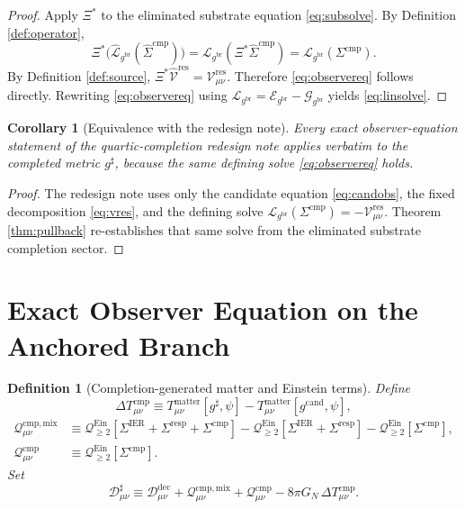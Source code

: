 \documentclass[11pt]{article}
\newcommand{\ObserverMap}{\Xi}
\newcommand{\ObserverMetric}{g^{\mathrm{br}}}
\newcommand{\CandidateMetric}{g^{\mathrm{cand}}}
\newcommand{\CompletedMetric}{g^{\sharp}}
\newcommand{\BaseShift}{\Sigma^{\mathrm{IER}}}
\newcommand{\ResponseShift}{\Sigma^{\mathrm{resp}}}
\newcommand{\CompShift}{\Sigma^{\mathrm{cmp}}}
\newcommand{\CompLift}{\widehat\Sigma^{\mathrm{cmp}}}
\newcommand{\ResidualCore}{\mathcal V_{\mu\nu}^{\mathrm{res}}}
\newcommand{\ResidualDec}{\mathcal D_{\mu\nu}^{\mathrm{dec}}}
\newcommand{\ResidualLift}{\widehat{\mathcal V}^{\mathrm{res}}}
\newcommand{\SubReducedEin}{\widehat{\mathcal L}_{\ObserverMetric}}
\newcommand{\ReducedEin}{\mathcal L_{\ObserverMetric}}
\newcommand{\GaugeBook}{\mathcal G_{\ObserverMetric}}
\newcommand{\EinLin}{\mathcal E_{\ObserverMetric}}
\newcommand{\EinQuad}{\mathcal Q_{\ge 2}^{\mathrm{Ein}}}
\newcommand{\CompMix}{\mathcal Q_{\mu\nu}^{\mathrm{cmp,mix}}}
\newcommand{\CompQuad}{\mathcal Q_{\mu\nu}^{\mathrm{cmp}}}
\newcommand{\CompDec}{\mathcal D_{\mu\nu}^{\sharp}}
\newcommand{\DeltaTComp}{\Delta T_{\mu\nu}^{\mathrm{cmp}}}
\newtheorem{definition}{Definition}
\newtheorem{corollary}{Corollary}
\begin{document}
\begin{proof}
Apply \(\ObserverMap^*\) to the eliminated substrate equation \eqref{eq:subsolve}. By Definition \ref{def:operator},
\[
\ObserverMap^*\bigl(\SubReducedEin(\CompLift)\bigr)
=
\ReducedEin(\ObserverMap^*\CompLift)
=
\ReducedEin(\CompShift).
\]
By Definition \ref{def:source}, \(\ObserverMap^*\ResidualLift=\ResidualCore\). Therefore \eqref{eq:observereq} follows directly. Rewriting \eqref{eq:observereq} using \(\ReducedEin=\EinLin-\GaugeBook\) yields \eqref{eq:linsolve}.
\end{proof}

\begin{corollary}[Equivalence with the redesign note]
\label{cor:equiv}
Every exact observer-equation statement of the quartic-completion redesign note applies verbatim to the completed metric \(\CompletedMetric\), because the same defining solve \eqref{eq:observereq} holds.
\end{corollary}

\begin{proof}
The redesign note uses only the candidate equation \eqref{eq:candobs}, the fixed decomposition \eqref{eq:vres}, and the defining solve \(\ReducedEin(\CompShift)=-\ResidualCore\). Theorem \ref{thm:pullback} re-establishes that same solve from the eliminated substrate completion sector.
\end{proof}

\section{Exact Observer Equation on the Anchored Branch}

\begin{definition}[Completion-generated matter and Einstein terms]
\label{def:extra}
Define
\begin{equation}
\DeltaTComp
\equiv
T_{\mu\nu}^{\mathrm{matter}}[\CompletedMetric,\psi]
-T_{\mu\nu}^{\mathrm{matter}}[\CandidateMetric,\psi],
\label{eq:deltatcomp}
\end{equation}
\begin{align}
\CompMix
&\equiv
\EinQuad[\BaseShift+\ResponseShift+\CompShift]
-\EinQuad[\BaseShift+\ResponseShift]
-\EinQuad[\CompShift],
\label{eq:compmix}
\\
\CompQuad
&\equiv
\EinQuad[\CompShift].
\label{eq:compquad}
\end{align}
Set
\begin{equation}
\CompDec
\equiv
\ResidualDec+\CompMix+\CompQuad-8\pi G_N\,\DeltaTComp.
\label{eq:compdec}
\end{equation}
\end{definition}
\end{document}
